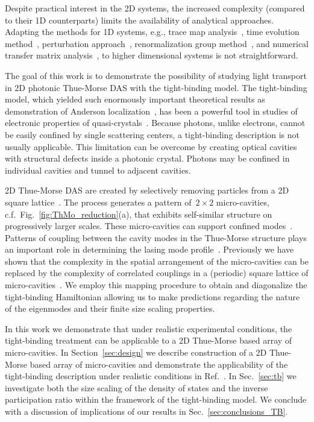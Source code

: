 Despite practical interest in the 2D systems, the increased complexity (compared to their 1D counterparts) limits the availability of analytical approaches. Adapting the methods for 1D systems, e.g., trace map analysis~\cite{1997_Liu, 1987_kohmoto,2007_Lei,1995_Chakrabarti,1989_Luck,2000_Wang}, time evolution method~\cite{1997_Lahiri}, perturbation approach~\cite{1995_Peng}, renormalization group method~\cite{1986_Niu,1983_Southern,1998_Ghosh}, and numerical transfer matrix analysis~\cite{1997_Pelster,2004_Peng, 2000_Peng,2003_Qiu,2004_Qiu,2007_Hiltunen}, to higher dimensional systems is not straightforward.

The goal of this work is to demonstrate the possibility of studying light transport in 2D photonic Thue-Morse DAS with the tight-binding model. The tight-binding model, which yielded such enormously important theoretical results as demonstration of Anderson localization~\cite{1958_Anderson,2009_Lagendijk_PT}, has been a powerful tool in studies of electronic properties of quasi-crystals~\cite{2003_Trebin_Quasicrystals}. Because photons, unlike electrons, cannot be easily confined by single scattering centers, a tight-binding description is not usually applicable. This limitation can be overcome by creating optical cavities with structural defects inside a photonic crystal. Photons may be confined in individual cavities and tunnel to adjacent cavities. 

2D Thue-Morse DAS are created by selectively removing particles from a 2D square lattice~\cite{2011_Dal_Negro_DAS_review,2008_Gopinath_DAS}. The process generates a pattern of~$2\times2$ micro-cavities, c.f.~Fig.~\ref{fig:ThMo_reduction}(a), that exhibits self-similar structure on progressively larger scales. These micro-cavities can support confined modes~\cite{2007_Moretti,2008_Boriskina}. Patterns of coupling between the cavity modes in the Thue-Morse structure plays an important role in determining the lasing mode profile~\cite{2011_Cao_DAS}. Previously we have shown that the complexity in the spatial arrangement of the micro-cavities can be replaced by the complexity of correlated couplings in a (periodic) square lattice of micro-cavities~\cite{2012_Payne_Mapping_2D_TM}. We employ this mapping procedure to obtain and diagonalize the tight-binding Hamiltonian allowing us to make predictions regarding the nature of the eigenmodes and their finite size scaling properties.

In this work we demonstrate that under realistic experimental conditions, the tight-binding treatment can be applicable to a 2D Thue-Morse based array of micro-cavities. In Section~\ref{sec:design} we describe construction of a 2D Thue-Morse based array of micro-cavities and demonstrate the applicability of the tight-binding description under realistic conditions in Ref.~. In Sec.~\ref{sec:tb} we investigate both the size scaling of the density of states and the inverse participation ratio within the framework of the tight-binding model. We conclude with a discussion of implications of our results in Sec.~\ref{sec:conclusions_TB}.

